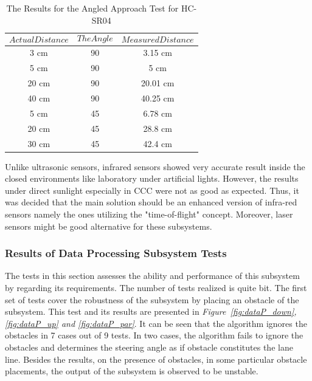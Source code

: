 \documentclass[a4paper,12pt]{article}
\begin{document}
		\begin{table}[H]
		  \centering
		  	\caption{The Results for the Angled Approach Test for HC-SR04}
		    \begin{tabular}{c|c|c}
    		   $$Actual Distance$$ & $$The Angle$$ & $$Measured Distance$$ \\ \hline
			   3  cm & 90 & 3.15 cm  \\ \hline
    		   5  cm & 90 & 5 cm  \\ \hline
    		   20 cm & 90 & 20.01 cm  \\ \hline
    		   40 cm & 90 & 40.25 cm \\ \hline
       		   5  cm & 45 & 6.78 cm \\ \hline
    		   20 cm & 45 & 28.8 cm  \\ \hline
       		   30 cm & 45 & 42.4 cm  
  			\end{tabular}
  			\label{tab:aat}
		\end{table}
		
		 Unlike ultrasonic sensors, infrared sensors showed very accurate result inside the closed environments like laboratory under artificial lights. However, the results under direct sunlight especially in CCC were not as good as expected.  Thus, it was decided that the main solution should be an enhanced version of infra-red sensors namely the ones utilizing the "time-of-flight" concept. Moreover, laser sensors might be good alternative for these subsystems.
	
	
		
	
		
		
		
	\subsubsection*{Results of Data Processing Subsystem Tests}\label{sec:DataProcessingSubsystemTests}
	The tests in this section assesses the ability and performance of this subsystem by regarding its requirements. The number of tests realized is quite  bit. The first set of tests cover the robustness of the subsystem by placing an obstacle of the subsystem. This test and its results are presented in \textit{Figure~\ref{fig:dataP_down},\ref{fig:dataP_up} and \ref{fig:dataP_par}}. It can be seen that the algorithm ignores the obstacles in 7 cases out of 9 tests. In two cases, the algorithm fails to ignore the obstacles and determines the steering angle as if obstacle constitutes the lane line. Besides the results, on the presence of obstacles, in some particular obstacle placements, the output of the subsystem is observed to be unstable.
	
\end{document}
